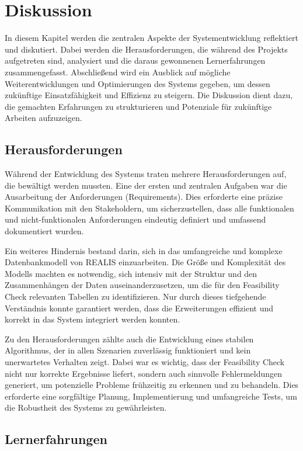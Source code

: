 \chapter{Diskussion}
In diesem Kapitel werden die zentralen Aspekte der Systementwicklung reflektiert und diskutiert. Dabei werden die Herausforderungen, die während des Projekts aufgetreten sind, analysiert und die daraus gewonnenen Lernerfahrungen zusammengefasst. Abschließend wird ein Ausblick auf mögliche Weiterentwicklungen und Optimierungen des Systems gegeben, um dessen zukünftige Einsatzfähigkeit und Effizienz zu steigern. Die Diskussion dient dazu, die gemachten Erfahrungen zu strukturieren und Potenziale für zukünftige Arbeiten aufzuzeigen.
\section{Herausforderungen}

Während der Entwicklung des Systems traten mehrere Herausforderungen auf, die bewältigt werden mussten. Eine der ersten und zentralen Aufgaben war die Ausarbeitung der Anforderungen (Requirements). Dies erforderte eine präzise Kommunikation mit den Stakeholdern, um sicherzustellen, dass alle funktionalen und nicht-funktionalen Anforderungen eindeutig definiert und umfassend dokumentiert wurden. 

Ein weiteres Hindernis bestand darin, sich in das umfangreiche und komplexe Datenbankmodell von \gls{REALIS} einzuarbeiten. Die Größe und Komplexität des Modells machten es notwendig, sich intensiv mit der Struktur und den Zusammenhängen der Daten auseinanderzusetzen, um die für den Feasibility Check relevanten Tabellen zu identifizieren. Nur durch dieses tiefgehende Verständnis konnte garantiert werden, dass die Erweiterungen effizient und korrekt in das System integriert werden konnten.

Zu den Herausforderungen zählte auch die Entwicklung eines stabilen Algorithmus, der in allen Szenarien zuverlässig funktioniert und kein unerwartetes Verhalten zeigt. Dabei war es wichtig, dass der Feasibility Check nicht nur korrekte Ergebnisse liefert, sondern auch sinnvolle Fehlermeldungen generiert, um potenzielle Probleme frühzeitig zu erkennen und zu behandeln. Dies erforderte eine sorgfältige Planung, Implementierung und umfangreiche Tests, um die Robustheit des Systems zu gewährleisten.

\section{Lernerfahrungen}


